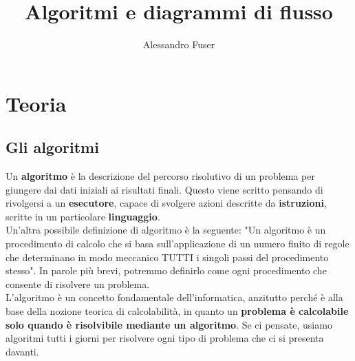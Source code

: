 \documentclass{article}
\begin{document}
	
	\title{Algoritmi e diagrammi di flusso}
	\author{Alessandro Fuser}
	\maketitle
	
	\pagebreak
	
	\tableofcontents
	
	\pagebreak
	
	\section{Teoria}
	\subsection{Gli algoritmi}
	Un \textbf{algoritmo} è la descrizione del percorso risolutivo di un problema per giungere dai dati iniziali ai risultati finali. Questo viene scritto pensando di rivolgersi a un \textbf{esecutore}, capace di svolgere azioni descritte da \textbf{istruzioni}, scritte in un particolare \textbf{linguaggio}.\\
	Un'altra possibile definizione di algoritmo è la seguente: "Un algoritmo è un procedimento di calcolo che si basa sull'applicazione di un numero finito di regole che determinano in modo meccanico TUTTI i singoli passi del procedimento stesso". In parole più brevi, potremmo definirlo come ogni procedimento che consente di risolvere un problema.\\
	L'algoritmo è un concetto fondamentale dell'informatica, anzitutto perché è alla base della nozione teorica di calcolabilità, in quanto un \textbf{problema è calcolabile solo quando è risolvibile mediante un algoritmo}. Se ci pensate, usiamo algoritmi tutti i giorni per risolvere ogni tipo di problema che ci si presenta davanti.
	
\end{document}
